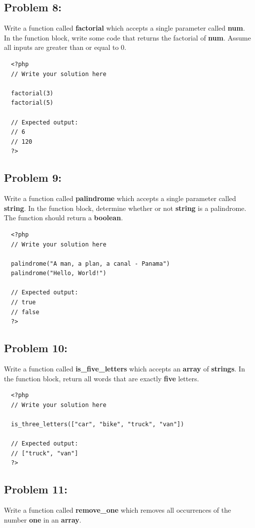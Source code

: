 \documentclass{article}
\begin{document}
\subsection*{Problem 8:}
Write a function called \textbf{factorial} which accepts a single parameter called \textbf{num}. In the function block, write some code that returns the factorial of \textbf{num}. Assume all inputs are greater than or equal to 0. 

\begin{verbatim}
  <?php  
  // Write your solution here

  factorial(3)
  factorial(5)

  // Expected output:
  // 6
  // 120
  ?>
\end{verbatim}

\subsection*{Problem 9:}
Write a function called \textbf{palindrome} which accepts a single parameter called \textbf{string}. In the function block, determine whether or not \textbf{string} is a palindrome. The function should return a \textbf{boolean}.

\begin{verbatim}
  <?php  
  // Write your solution here

  palindrome("A man, a plan, a canal - Panama")
  palindrome("Hello, World!")

  // Expected output:
  // true
  // false
  ?>
\end{verbatim}
 
\subsection*{Problem 10:}
Write a function called \textbf{is\_five\_letters} which accepts an \textbf{array} of \textbf{strings}. In the function block, return all words that are exactly \textbf{five} letters.

\begin{verbatim}
  <?php  
  // Write your solution here

  is_three_letters(["car", "bike", "truck", "van"])

  // Expected output:
  // ["truck", "van"] 
  ?>
\end{verbatim}

\subsection*{Problem 11:}
Write a function called \textbf{remove\_one} which removes all occurrences of the number \textbf{one} in an \textbf{array}. 
\end{document}
